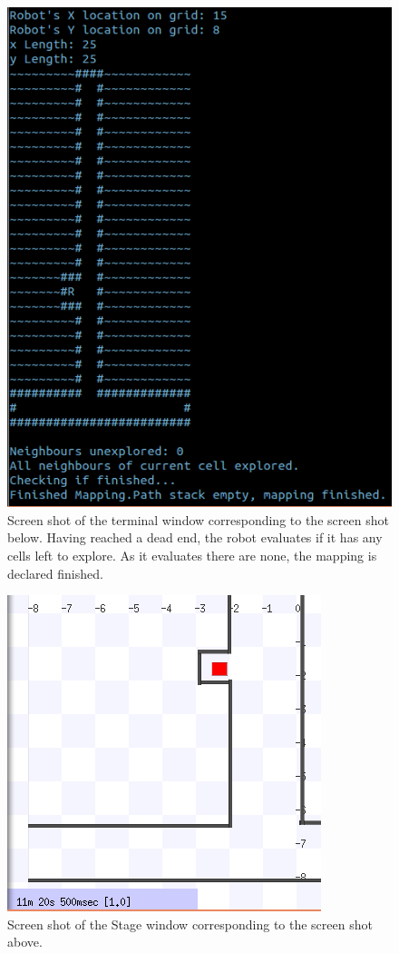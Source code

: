 \documentclass[a4paper,12pt]{article}
\begin{document}
\begin{figure}[H]
\includegraphics[scale=1.0]{RunT5.png}
\caption{Screen shot of the terminal window corresponding to the screen shot below. Having reached a dead end, the robot evaluates if it has any cells left to explore. As it evaluates there are none, the mapping is declared finished.}
\end{figure}

\begin{figure}[H]
\includegraphics[scale=0.9]{RunS5.png}
\caption{Screen shot of the Stage window corresponding to the screen shot above.}
\end{figure}
\end{document}

